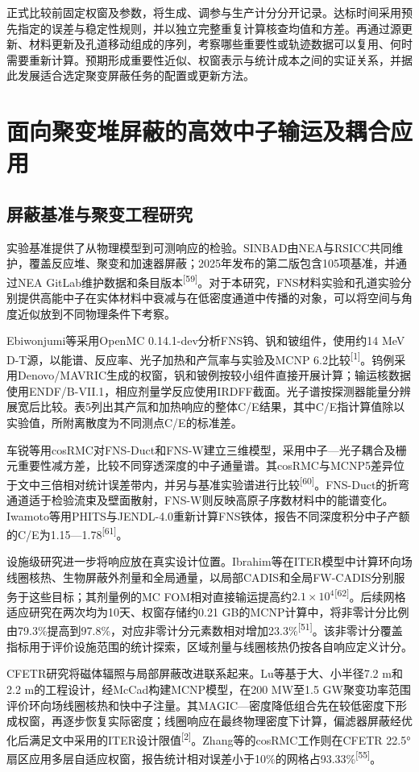 \documentclass[UTF8, zihao=-4, fontset=none, a4paper]{ctexart}
\newcommand{\upcite}[1]{\textsuperscript{[#1]}}
\begin{document}
正式比较前固定权窗及参数，将生成、调参与生产计分分开记录。达标时间采用预先指定的误差与稳定性规则，并以独立完整重复计算核查均值和方差。再通过源更新、材料更新及孔道移动组成的序列，考察哪些重要性或轨迹数据可以复用、何时需要重新计算。预期形成重要性近似、权窗表示与统计成本之间的实证关系，并据此发展适合选定聚变屏蔽任务的配置或更新方法。

\section{面向聚变堆屏蔽的高效中子输运及耦合应用}\label{sec:5}

\subsection{屏蔽基准与聚变工程研究}

实验基准提供了从物理模型到可测响应的检验。SINBAD由NEA与RSICC共同维护，覆盖反应堆、聚变和加速器屏蔽；2025年发布的第二版包含105项基准，并通过NEA GitLab维护数据和条目版本\upcite{59}。对于本研究，FNS材料实验和孔道实验分别提供高能中子在实体材料中衰减与在低密度通道中传播的对象，可以将空间与角度近似放到不同物理条件下考察。

Ebiwonjumi等采用OpenMC 0.14.1-dev分析FNS钨、钒和铍组件，使用约14 MeV D-T源，以能谱、反应率、光子加热和产氚率与实验及MCNP 6.2比较\upcite{1}。钨例采用Denovo/MAVRIC生成的权窗，钒和铍例按较小组件直接开展计算；输运核数据使用ENDF/B-VII.1，相应剂量学反应使用IRDFF截面。光子谱按探测器能量分辨展宽后比较。表5列出其产氚和加热响应的整体C/E结果，其中C/E指计算值除以实验值，所附离散度为不同测点C/E的标准差。

车锐等用cosRMC对FNS-Duct和FNS-W建立三维模型，采用中子---光子耦合及栅元重要性减方差，比较不同穿透深度的中子通量谱。其cosRMC与MCNP5差异位于文中三倍相对统计误差带内，并另与基准实验谱进行比较\upcite{60}。FNS-Duct的折弯通道适于检验流束及壁面散射，FNS-W则反映高原子序数材料中的能谱变化。Iwamoto等用PHITS与JENDL-4.0重新计算FNS铁体，报告不同深度积分中子产额的C/E为1.15---1.78\upcite{61}。

设施级研究进一步将响应放在真实设计位置。Ibrahim等在ITER模型中计算环向场线圈核热、生物屏蔽外剂量和全局通量，以局部CADIS和全局FW-CADIS分别服务于这些目标；其剂量例的MC FOM相对直接输运提高约\(2.1 \times 10^{4}\)\upcite{62}。后续网格适应研究在两次均为10天、权窗存储约0.21 GB的MCNP计算中，将非零计分比例由79.3\%提高到97.8\%，对应非零计分元素数相对增加23.3\%\upcite{51}。该非零计分覆盖指标用于评价设施范围的统计探索，区域剂量与线圈核热仍按各自响应定义计分。

CFETR研究将磁体辐照与局部屏蔽改进联系起来。Lu等基于大、小半径7.2 m和2.2 m的工程设计，经McCad构建MCNP模型，在200 MW至1.5 GW聚变功率范围评价环向场线圈核热和快中子注量。其MAGIC---密度降低组合先在较低密度下形成权窗，再逐步恢复实际密度；线圈响应在最终物理密度下计算，偏滤器屏蔽经优化后满足文中采用的ITER设计限值\upcite{2}。Zhang等的cosRMC工作则在CFETR 22.5°扇区应用多层自适应权窗，报告统计相对误差小于10\%的网格占93.33\%\upcite{55}。
\end{document}
